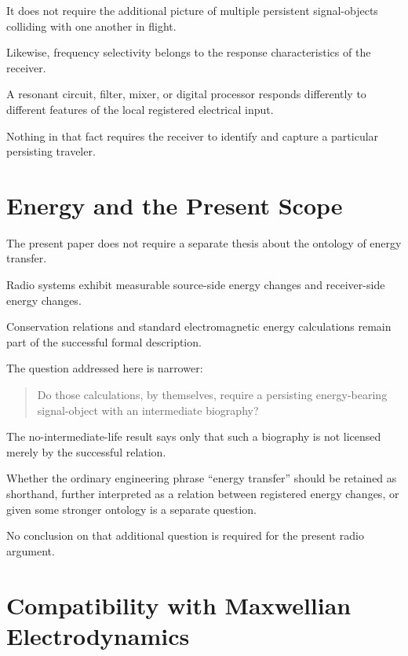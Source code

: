 \documentclass[12pt,onecolumn]{article}
\begin{document}
It does not require the additional picture of multiple persistent
signal-objects colliding with one another in flight.

Likewise, frequency selectivity belongs to the response characteristics
of the receiver.

A resonant circuit, filter, mixer, or digital processor responds
differently to different features of the local registered electrical
input.

Nothing in that fact requires the receiver to identify and capture a
particular persisting traveler.

\section{Energy and the Present Scope}

The present paper does not require a separate thesis about the ontology
of energy transfer.

Radio systems exhibit measurable source-side energy changes and
receiver-side energy changes.

Conservation relations and standard electromagnetic energy calculations
remain part of the successful formal description.

The question addressed here is narrower:

\begin{quote}
Do those calculations, by themselves, require a persisting
energy-bearing signal-object with an intermediate biography?
\end{quote}

The no-intermediate-life result says only that such a biography is not
licensed merely by the successful relation.

Whether the ordinary engineering phrase ``energy transfer'' should be
retained as shorthand, further interpreted as a relation between
registered energy changes, or given some stronger ontology is a separate
question.

No conclusion on that additional question is required for the present
radio argument.

\section{Compatibility with Maxwellian Electrodynamics}
\end{document}
